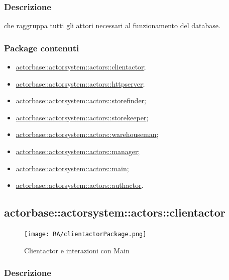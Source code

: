 \documentclass{scalatekids-article}
\begin{document}
\subsubsection{Descrizione}

 che raggruppa tutti gli attori necessari al funzionamento del database.

\subsubsection{Package contenuti}
\begin{itemize}
\item \hyperref[sec:actorbase::actorsystem::actors::clientactor]{actorbase::actorsystem::actors::clientactor};
\item \hyperref[sec:actorbase::actorsystem::actors::httpserver]{actorbase::actorsystem::actors::httpserver};
\item \hyperref[sec:actorbase::actorsystem::actors::storefinder]{actorbase::actorsystem::actors::storefinder};
\item \hyperref[sec:actorbase::actorsystem::actors::storekeeper]{actorbase::actorsystem::actors::storekeeper};
\item \hyperref[sec:actorbase::actorsystem::actors::warehouseman]{actorbase::actorsystem::actors::warehouseman};
\item \hyperref[sec:actorbase::actorsystem::actors::manager]{actorbase::actorsystem::actors::manager};
\item \hyperref[sec:actorbase::actorsystem::actors::main]{actorbase::actorsystem::actors::main};
\item \hyperref[sec:actorbase::actorsystem::actors::authactor]{actorbase::actorsystem::actors::authactor}.
\end{itemize}

\subsection{actorbase::actorsystem::actors::clientactor}
\label{sec:actorbase::actorsystem::actors::clientactor}

\begin{figure}[H]
  \begin{center}
    \texttt{[image: RA/clientactorPackage.png]}
    \caption{ Clientactor e interazioni con Main}
  \end{center}
\end{figure}

\subsubsection{Descrizione}
\end{document}
